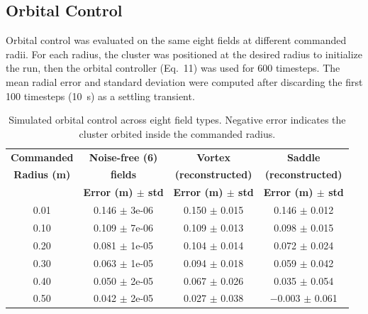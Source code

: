 \documentclass[lettersize,journal]{IEEEtran}
\begin{document}
\subsection{Orbital Control}

Orbital control was evaluated on the same eight fields at different commanded radii. For each radius, the cluster was positioned at the desired radius to initialize the run, then the orbital controller (Eq.~11) was used for 600 timesteps. The mean radial error and standard deviation were computed after discarding the first 100 timesteps (10~s) as a settling transient.

\begin{table}[!t]
    \centering
    \caption{Simulated orbital control across eight field types. Negative error indicates the cluster orbited inside the commanded radius.}
    \label{tab:simulation_orbital_results}
    \footnotesize
    \setlength{\tabcolsep}{3pt}
    \begin{tabular}{cccc}
    \hline
    \textbf{Commanded} & \textbf{Noise-free (6)} & \textbf{Vortex} & \textbf{Saddle} \\
    \textbf{Radius (m)} & \textbf{fields} & \textbf{(reconstructed)} & \textbf{(reconstructed)} \\
     & \textbf{Error (m) $\pm$ std} & \textbf{Error (m) $\pm$ std} & \textbf{Error (m) $\pm$ std} \\
    \hline
    0.01 & 0.146 $\pm$ 3e-06 & 0.150 $\pm$ 0.015 & 0.146 $\pm$ 0.012 \\
    0.10 & 0.109 $\pm$ 7e-06 & 0.109 $\pm$ 0.013 & 0.098 $\pm$ 0.015 \\
    0.20 & 0.081 $\pm$ 1e-05 & 0.104 $\pm$ 0.014 & 0.072 $\pm$ 0.024 \\
    0.30 & 0.063 $\pm$ 1e-05 & 0.094 $\pm$ 0.018 & 0.059 $\pm$ 0.042 \\
    0.40 & 0.050 $\pm$ 2e-05 & 0.067 $\pm$ 0.026 & 0.035 $\pm$ 0.054 \\
    0.50 & 0.042 $\pm$ 2e-05 & 0.027 $\pm$ 0.038 & $-$0.003 $\pm$ 0.061 \\

    \hline
    \end{tabular}
    \end{table}
\end{document}
